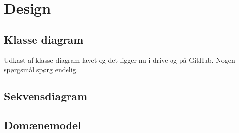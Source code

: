 \section{Design}

\subsection{Klasse diagram}
    Udkast af klasse diagram lavet og det ligger nu i drive og på GitHub. 
    Nogen spørgsmål spørg endelig.
    

\subsection{Sekvensdiagram}


\subsection{Domænemodel}